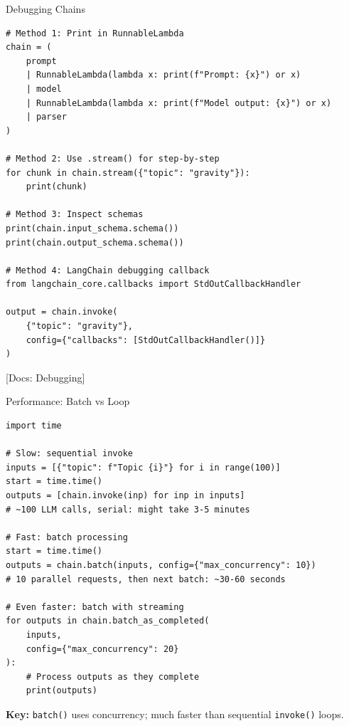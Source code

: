 \documentclass[aspectratio=169,11pt]{beamer}
\newcommand{\docref}[1]{{\scriptsize\color{docgray}[Docs: #1]}}
\begin{document}
\begin{frame}[fragile,shrink=2]{Debugging Chains}
  \begin{codebox}
\begin{lstlisting}
# Method 1: Print in RunnableLambda
chain = (
    prompt
    | RunnableLambda(lambda x: print(f"Prompt: {x}") or x)
    | model
    | RunnableLambda(lambda x: print(f"Model output: {x}") or x)
    | parser
)

# Method 2: Use .stream() for step-by-step
for chunk in chain.stream({"topic": "gravity"}):
    print(chunk)

# Method 3: Inspect schemas
print(chain.input_schema.schema())
print(chain.output_schema.schema())

# Method 4: LangChain debugging callback
from langchain_core.callbacks import StdOutCallbackHandler

output = chain.invoke(
    {"topic": "gravity"},
    config={"callbacks": [StdOutCallbackHandler()]}
)
\end{lstlisting}
  \end{codebox}

  \docref{Debugging}
\end{frame}

\begin{frame}[fragile]{Performance: Batch vs Loop}
  \begin{codebox}
\begin{lstlisting}
import time

# Slow: sequential invoke
inputs = [{"topic": f"Topic {i}"} for i in range(100)]
start = time.time()
outputs = [chain.invoke(inp) for inp in inputs]
# ~100 LLM calls, serial: might take 3-5 minutes

# Fast: batch processing
start = time.time()
outputs = chain.batch(inputs, config={"max_concurrency": 10})
# 10 parallel requests, then next batch: ~30-60 seconds

# Even faster: batch with streaming
for outputs in chain.batch_as_completed(
    inputs,
    config={"max_concurrency": 20}
):
    # Process outputs as they complete
    print(outputs)
\end{lstlisting}
  \end{codebox}

  \vspace{0.12em}
  \small \textbf{Key:} \texttt{batch()} uses concurrency; much faster than sequential \texttt{invoke()} loops.
\end{frame}
\end{document}
